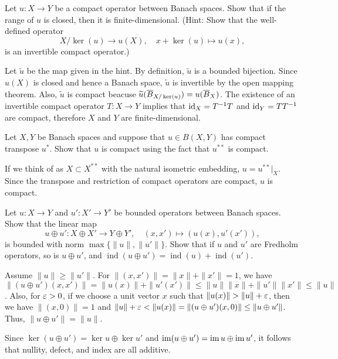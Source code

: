 \documentclass[12pt]{article}
\DeclareMathOperator{\ind}{ind}
\begin{document}
\begin{prb}
Let $u:X\to Y$ be a compact operator between Banach spaces.
Show that if the range of $u$ is closed, then it is finite-dimensional.
(Hint: Show that the well-defined operator
\[X/\ker(u)\to u(X),\quad x+\ker(u)\mapsto u(x),\]
is an invertible compact operator.)
\end{prb}
\begin{sol}
Let $\tilde u$ be the map given in the hint.
By definition, $\tilde u$ is a bounded bijection.
Since $u(X)$ is closed and hence a Banach space, $\tilde u$ is invertible by the open mapping theorem.
Also, $\tilde u$ is compact beacuse $\widetilde u(\overline B_{X/\ker(u)})=u(\overline B_X)$.
The existence of an invertible compact operator $T:X\to Y$ implies that $\operatorname{id}_X=T^{-1}T$ and $\operatorname{id}_Y=TT^{-1}$ are compact, therefore $X$ and $Y$ are finite-dimensional.
\end{sol}


\begin{prb}
Let $X,Y$ be Banach spaces and suppose that $u\in B(X,Y)$ has compact transpose $u^*$.
Show that $u$ is compact using the fact that $u^{**}$ is compact.
\end{prb}
\begin{sol}
If we think of as $X\subset X^{**}$ with the natural isometric embedding, $u=u^{**}|_X$.
Since the transpose and restriction of compact operators are compact, $u$ is compact.
\end{sol}


\begin{prb}
Let $u:X\to Y$ and $u':X'\to Y'$ be bounded operators between Banach spaces.
Show that the linear map
\[u\oplus u':X\oplus X'\to Y\oplus Y',\quad(x,x')\mapsto(u(x), u'(x')),\]
is bounded with norm $\max\{\|u\|,\|u'\|\}$.
Show that if $u$ and $u'$ are Fredholm operators, so is $u\oplus u'$, and $\ind(u\oplus u')=\ind(u)+\ind(u')$.
\end{prb}
\begin{sol}
Assume $\|u\|\ge\|u'\|$.
For $\|(x,x')\|=\|x\|+\|x'\|=1$, we have $\|(u\oplus u')(x,x')\|=\|u(x)\|+\|u'(x')\|\le\|u\|\|x\|+\|u'\|\|x'\|\le\|u\|$.
Also, for $\varepsilon>0$, if we choose a unit vector $x$ such that $\|u(x)\|>\|u\|+\e$, then we have $\|(x,0)\|=1$ and $\|u\|+\varepsilon<\|u(x)\|=\|(u\oplus u')(x,0)\|\le\|u\oplus u'\|$.
Thus, $\|u\oplus u'\|=\|u\|$.

Since $\ker(u\oplus u')=\ker u\oplus\ker u'$ and $\operatorname{im}(u\oplus u')=\operatorname{im} u\oplus\operatorname{im} u'$, it follows that nullity, defect, and index are all additive.
\end{sol}
\end{document}
